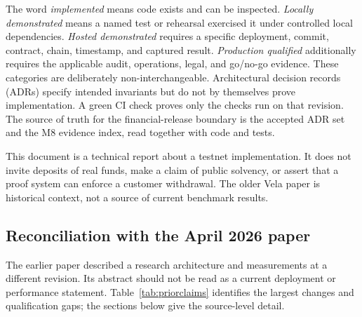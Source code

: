 \documentclass[envcountsame,runningheads,notitlepage]{llncs}
\begin{document}
The word \emph{implemented} means code exists and can be inspected. \emph{Locally demonstrated} means a named test or rehearsal exercised it under controlled local dependencies. \emph{Hosted demonstrated} requires a specific deployment, commit, contract, chain, timestamp, and captured result. \emph{Production qualified} additionally requires the applicable audit, operations, legal, and go/no-go evidence. These categories are deliberately non-interchangeable. Architectural decision records (ADRs) specify intended invariants but do not by themselves prove implementation. A green CI check proves only the checks run on that revision. The source of truth for the financial-release boundary is the accepted ADR set and the M8 evidence index, read together with code and tests.\cite{adrs,m8}

This document is a technical report about a testnet implementation. It does not invite deposits of real funds, make a claim of public solvency, or assert that a proof system can enforce a customer withdrawal. The older Vela paper is historical context, not a source of current benchmark results.\cite{vela2026}

\subsection{Reconciliation with the April 2026 paper}
The earlier paper described a research architecture and measurements at a different revision. Its abstract should not be read as a current deployment or performance statement. Table~\ref{tab:priorclaims} identifies the largest changes and qualification gaps; the sections below give the source-level detail.\cite{vela2026,source}
\end{document}
